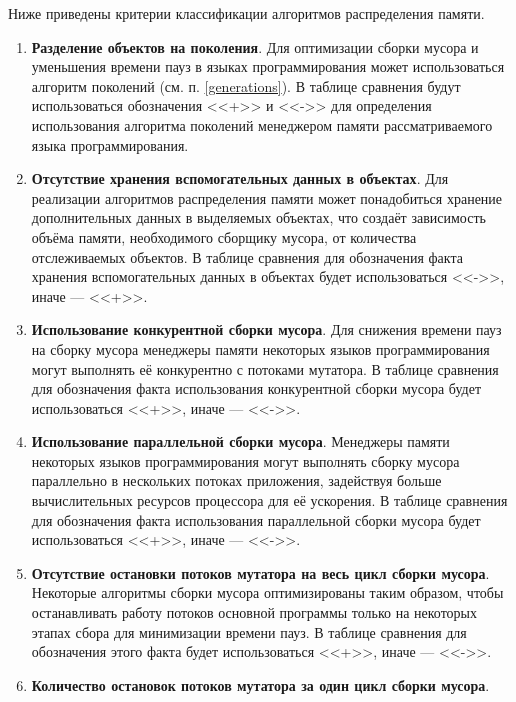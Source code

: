 Ниже приведены критерии классификации алгоритмов распределения памяти.

\begin{enumerate}[label*=\arabic*.]
	\item \textbf{Разделение объектов на поколения}. \newline
	Для оптимизации сборки мусора и уменьшения времени пауз в языках программирования может использоваться алгоритм поколений (см. п. \ref{generations}). В таблице сравнения будут использоваться обозначения <<+>> и <<->> для определения использования алгоритма поколений менеджером памяти рассматриваемого языка программирования.
	
	\item \textbf{Отсутствие хранения вспомогательных данных в объектах}. \newline
	Для реализации алгоритмов распределения памяти может понадобиться хранение дополнительных данных в выделяемых объектах, что создаёт зависимость объёма памяти, необходимого сборщику мусора, от количества отслеживаемых объектов. В таблице сравнения для обозначения факта хранения вспомогательных данных в объектах будет использоваться <<->>, иначе --- <<+>>.
	
	\item \textbf{Использование конкурентной сборки мусора}. \newline
	Для снижения времени пауз на сборку мусора менеджеры памяти некоторых языков программирования могут выполнять её конкурентно с потоками мутатора. В таблице сравнения для обозначения факта использования конкурентной сборки мусора будет использоваться <<+>>, иначе --- <<->>.
	
	\item \textbf{Использование параллельной сборки мусора}. \newline
	Менеджеры памяти некоторых языков программирования могут выполнять сборку мусора параллельно в нескольких потоках приложения, задействуя больше вычислительных ресурсов процессора для её ускорения. В таблице сравнения для обозначения факта использования параллельной сборки мусора будет использоваться <<+>>, иначе --- <<->>.
	
	\item \textbf{Отсутствие остановки потоков мутатора на весь цикл сборки мусора}. \newline
	Некоторые алгоритмы сборки мусора оптимизированы таким образом, чтобы останавливать работу потоков основной программы только на некоторых этапах сбора для минимизации времени пауз. В таблице сравнения для обозначения этого факта будет использоваться <<+>>, иначе --- <<->>.
	
	\item \textbf{Количество остановок потоков мутатора за один цикл сборки мусора}.
\end{enumerate}

